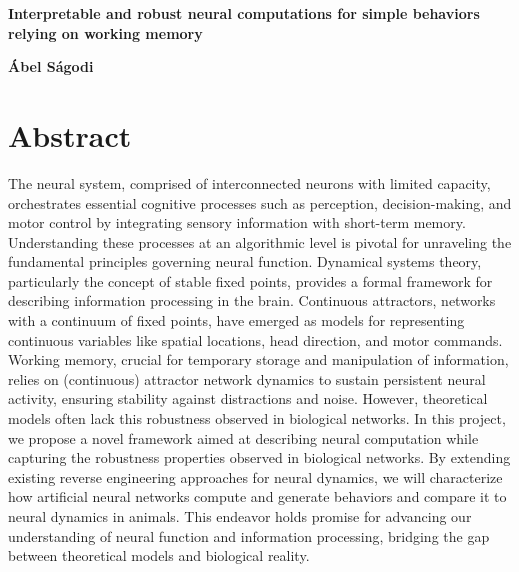 \documentclass[12pt,letterpaper, onecolumn]{article}
\theoremstyle{definition}
\theoremstyle{remark}
\begin{document}

\begin{center}
\LARGE{\bf  Interpretable and robust neural computations for simple behaviors relying on working memory}
\end{center}
\begin{center}
{\textbf{\'Abel S\'agodi}}
\end{center}

\section*{Abstract}

The neural system, comprised of interconnected neurons with limited capacity, orchestrates essential cognitive processes such as perception, decision-making, and motor control by integrating sensory information with short-term memory.
Understanding these processes at an algorithmic level is pivotal for unraveling the fundamental principles governing neural function.
Dynamical systems theory, particularly the concept of stable fixed points, provides a formal framework for describing information processing in the brain.
Continuous attractors, networks with a continuum of fixed points, have emerged as models for representing continuous variables like spatial locations, head direction, and motor commands. 
Working memory, crucial for temporary storage and manipulation of information, relies on (continuous) attractor network dynamics to sustain persistent neural activity, ensuring stability against distractions and noise.
However, theoretical models often lack this robustness observed in biological networks.
In this project, we propose a novel framework aimed at describing neural computation while capturing the robustness properties observed in biological networks. By extending existing reverse engineering approaches for neural dynamics, we will characterize how artificial neural networks compute and generate behaviors and compare it to neural dynamics in animals. This endeavor holds promise for advancing our understanding of neural function and information processing, bridging the gap between theoretical models and biological reality.
\end{document}
